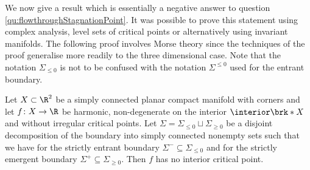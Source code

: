 We now give a result which is essentially a negative answer to question \ref{qu:flowthroughStagnationPoint}.
It was possible to prove this statement using complex analysis, level sets of critical points or alternatively using invariant manifolds.
The following proof involves Morse theory since the techniques of the proof generalise more readily to the three dimensional case.
Note that the notation $\Sigma_{\leq0}$ is not to be confused with the notation $\Sigma^{\leq0}$ used for the
entrant boundary.
\begin{proposition}[Negative answer to question \ref{qu:flowthroughStagnationPoint} in $d=2$ dimensions]\label{pr:n2_negativeResult}
  Let $X\subset\R^2$ be a simply connected planar compact manifold with corners and let $f\colon X\to\R$ be harmonic, non-degenerate on the interior
  $\interior\brk*{X}$ and without irregular critical points.
  Let $\Sigma=\Sigma_{\leq0}\sqcup\Sigma_{\geq0}$ be a disjoint decomposition of the boundary into simply connected nonempty sets such that
  we have for the strictly entrant boundary $\Sigma^-\subseteq\Sigma_{\leq0}$ and for the strictly emergent boundary $\Sigma^+\subseteq\Sigma_{\geq0}$.
  Then $f$ has no interior critical point.
\end{proposition}

